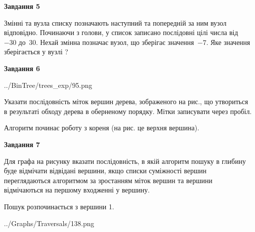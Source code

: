 \documentclass[12pt, ukrainian]{article}
\begin{document}
{\begin {large}
{\begin {center}\textbf{Завдання 5}\end {center}}\par
Змінні  та  вузла списку позначають наступний та попередній за ним вузол відповідно. Починаючи з голови, у список записано послідовні цілі числа від~$-30$ до~$30$. Нехай змінна  позначає вузол, що зберігає значення~$-7$.
Яке значення зберігається у вузлі  ?\par
\newpage

{\begin {center}\textbf{Завдання 6}\end {center}}\par

\begin{center}
	{../BinTree/trees_exp/95.png}
\end{center}
Указати послідовність міток вершин дерева, зображеного на рис., що утвориться в результаті обходу дерева в оберненому порядку. Мітки записувати через пробіл.\par Алгоритм починає роботу з кореня (на рис. це верхня вершина).\par
\newpage

{\begin {center}\textbf{Завдання 7}\end {center}}\par
Для графа на рисунку вказати послідовність, в якій алгоритм пошуку в глибину буде відмічати відвідані вершини, якщо списки суміжності вершин переглядаються алгоритмом за зростанням міток вершин та вершини відмічаються на першому вход\-женні у вершину.\par
Пошук розпочинається з вершини 1.\par

\begin{center}
	{../Graphs/Traversals/138.png}
\end{center}\par
\newpage


\end{large}}
\end{document}
